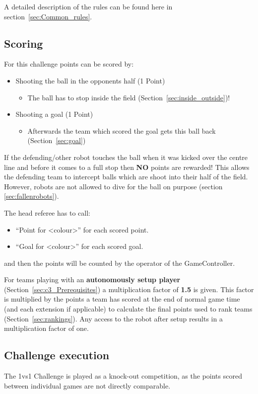 A detailed description of the rules can be found here in section~\ref{sec:Common_rules}.

\subsection{Scoring}
\label{sec:scoring}

For this challenge points can be scored by:
\begin{itemize}
	\item Shooting the ball in the opponents half (1 Point)
	\begin{itemize}
		\item The ball has to stop inside the field (\cf Section~\ref{sec:inside_outside})!
	\end{itemize} 
	\item Shooting a goal (1 Point)
	\begin{itemize}
		\item Afterwards the team which scored the goal gets this ball back (\cf Section~\ref{sec:goal})
	\end{itemize}
\end{itemize}

If the defending/other robot touches the ball when it was kicked over the centre line and before it comes to a full stop then \textbf{NO} points are rewarded! This allows the defending team to intercept balls which are shoot into their half of the field. However, robots are not allowed to dive for the ball on purpose (\cf section \ref{sec:fallenrobots}).

The head referee has to call:
\begin{itemize}
	\item ``Point for \textless colour\textgreater'' for each scored point.
	\item ``Goal for \textless colour\textgreater'' for each scored goal.
\end{itemize}
and then the points will be counted by the operator of the GameController.

For teams playing with an \textbf{autonomously setup player} (\cf Section~\ref{sec:c3_Prerequisites}) a multiplication factor of \textbf{1.5} is given. This factor is multiplied by the points a team has scored at the end of normal game time (and each extension if applicable) to calculate the final points used to rank teams (\cf Section~\ref{sec:rankings}). Any access to the robot after setup results in a multiplication factor of one.

\subsection{Challenge execution}
The 1vs1 Challenge is played as a knock-out competition, as the points scored between individual games are not directly comparable. 

